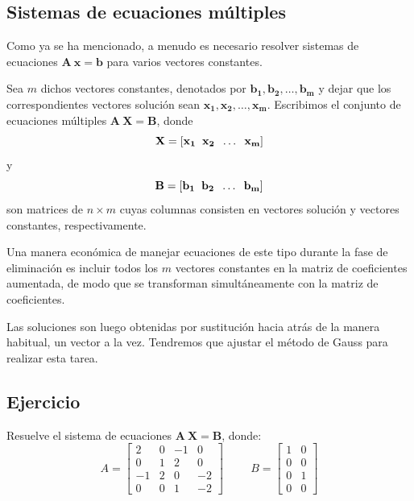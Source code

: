 \subsection{Sistemas de ecuaciones múltiples}
Como ya se ha mencionado, a menudo es necesario resolver sistemas de ecuaciones $\mathbf{A \: x = b}$ para varios vectores constantes.
\par
Sea $m$ dichos vectores constantes, denotados por $\mathbf{b_{1}, b_{2}, \ldots, b_{m}}$ y dejar que los correspondientes vectores solución sean $\mathbf{x_{1}, x_{2}, \ldots, x_{m}}$. 
Escribimos el conjunto de ecuaciones múltiples $\mathbf{A \: X = B}$, donde
\[ \mathbf{X} = \left[ \mathbf{x_{1}} \hspace{0.2cm} \mathbf{x_{2}} \hspace{0.2cm} \ldots \hspace{0.2cm} \mathbf{x_{m}} \right] \]
y
\[ \mathbf{B} = \left[ \mathbf{b_{1}} \hspace{0.2cm} \mathbf{b_{2}} \hspace{0.2cm} \ldots \hspace{0.2cm} \mathbf{b_{m}} \right] \]
son matrices de $n \times m$ cuyas columnas consisten en vectores solución y vectores constantes, respectivamente.
\par
Una manera económica de manejar ecuaciones de este tipo durante la fase de eliminación es incluir todos los $m$ vectores constantes en la matriz de coeficientes aumentada, de modo que se transforman simultáneamente con la matriz de coeficientes.
\par 
Las soluciones son luego obtenidas por sustitución hacia atrás de la manera habitual, un vector a la vez. Tendremos que ajustar el método de Gauss para realizar esta tarea.
\subsection*{Ejercicio}
Resuelve el sistema de ecuaciones $\mathbf{A \: X = B}$, donde:
\[ A = \begin{bmatrix}
2 & 0 & -1 & 0 \\
0 & 1 & 2 & 0 \\
-1 & 2 & 0 & -2 \\
0 & 0 & 1 & -2
\end{bmatrix}
\hspace{1cm} B =
\begin{bmatrix}
1 & 0 \\
0 & 0 \\
0 & 1 \\
0 & 0
\end{bmatrix} \]
